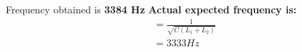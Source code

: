 \begin{enumerate}[label=\arabic*.,ref=\theenumi]
Frequency obtained is \textbf{3384 Hz}\newline
\textbf{Actual expected frequency is:}
\begin{align}
    = \frac{1}{\sqrt{C(L_1 +L_2)}}\\
    = 3333 Hz
\end{align}
\end{enumerate}
